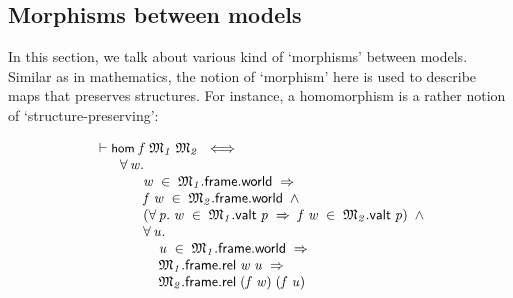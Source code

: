 \documentclass[letterpaper]{article}
\renewcommand{\HOLConst}[1]{{\textsf{\upshape\small #1}}}
\newenvironment{holmath}{\begin{displaymath}\begin{array}{l}}{\end{array}\end{displaymath}\ignorespacesafterend}
\begin{document}
\subsection{Morphisms between models}

In this section, we talk about various kind of `morphisms' between models. Similar as in mathematics, the notion of `morphism' here is used to describe maps that preserves structures. For instance, a homomorphism is a rather notion of `structure-preserving':

\begin{holmath}
  \ensuremath{\HOLTokenTurnstile}\HOLConst{hom}\;\HOLFreeVar{f}\;\HOLFreeVar{\ensuremath{\mathfrak{M}\sb{1}}}\;\HOLFreeVar{\ensuremath{\mathfrak{M}\sb{2}}}\;\HOLSymConst{\HOLTokenEquiv{}}\\
\;\;\;\;\;\;\;\HOLSymConst{\HOLTokenForall{}}\HOLBoundVar{w}.\\
\;\;\;\;\;\;\;\;\;\;\;\;\;\HOLBoundVar{w}\;\HOLSymConst{\HOLTokenIn{}}\;\HOLFreeVar{\ensuremath{\mathfrak{M}\sb{1}}}.\HOLFieldName{frame}.\HOLFieldName{world}\;\HOLSymConst{\HOLTokenImp{}}\\
\;\;\;\;\;\;\;\;\;\;\;\;\;\HOLFreeVar{f}\;\HOLBoundVar{w}\;\HOLSymConst{\HOLTokenIn{}}\;\HOLFreeVar{\ensuremath{\mathfrak{M}\sb{2}}}.\HOLFieldName{frame}.\HOLFieldName{world}\;\HOLSymConst{\HOLTokenConj{}}\\
\;\;\;\;\;\;\;\;\;\;\;\;\;(\HOLSymConst{\HOLTokenForall{}}\HOLBoundVar{p}.\;\HOLBoundVar{w}\;\HOLSymConst{\HOLTokenIn{}}\;\HOLFreeVar{\ensuremath{\mathfrak{M}\sb{1}}}.\HOLFieldName{valt}\;\HOLBoundVar{p}\;\HOLSymConst{\HOLTokenImp{}}\;\HOLFreeVar{f}\;\HOLBoundVar{w}\;\HOLSymConst{\HOLTokenIn{}}\;\HOLFreeVar{\ensuremath{\mathfrak{M}\sb{2}}}.\HOLFieldName{valt}\;\HOLBoundVar{p})\;\HOLSymConst{\HOLTokenConj{}}\\
\;\;\;\;\;\;\;\;\;\;\;\;\;\HOLSymConst{\HOLTokenForall{}}\HOLBoundVar{u}.\\
\;\;\;\;\;\;\;\;\;\;\;\;\;\;\;\;\;\HOLBoundVar{u}\;\HOLSymConst{\HOLTokenIn{}}\;\HOLFreeVar{\ensuremath{\mathfrak{M}\sb{1}}}.\HOLFieldName{frame}.\HOLFieldName{world}\;\HOLSymConst{\HOLTokenImp{}}\\
\;\;\;\;\;\;\;\;\;\;\;\;\;\;\;\;\;\HOLFreeVar{\ensuremath{\mathfrak{M}\sb{1}}}.\HOLFieldName{frame}.\HOLFieldName{rel}\;\HOLBoundVar{w}\;\HOLBoundVar{u}\;\HOLSymConst{\HOLTokenImp{}}\\
\;\;\;\;\;\;\;\;\;\;\;\;\;\;\;\;\;\HOLFreeVar{\ensuremath{\mathfrak{M}\sb{2}}}.\HOLFieldName{frame}.\HOLFieldName{rel}\;(\HOLFreeVar{f}\;\HOLBoundVar{w})\;(\HOLFreeVar{f}\;\HOLBoundVar{u})
\end{holmath}
\end{document}
